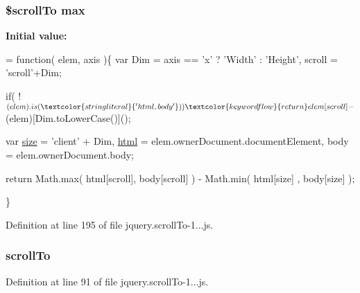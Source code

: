 \subsubsection[{\texorpdfstring{max}{max}}]{\setlength{\rightskip}{0pt plus 5cm}\${\bf scroll\+To} max}\hypertarget{jquery_8scrollTo-1_84_82_8js_a954f280ed2a81443e342686e9a429716}{}\label{jquery_8scrollTo-1_84_82_8js_a954f280ed2a81443e342686e9a429716}
{\bfseries Initial value\+:}
\begin{DoxyCode}
= \textcolor{keyword}{function}( elem, axis )\{
        var Dim = axis == \textcolor{charliteral}{'x'} ? \textcolor{stringliteral}{'Width'} : \textcolor{stringliteral}{'Height'},
            scroll = \textcolor{stringliteral}{'scroll'}+Dim;
        
        \textcolor{keywordflow}{if}( !$(elem).is(\textcolor{stringliteral}{'html,body'}) )
            \textcolor{keywordflow}{return} elem[scroll] - $(elem)[Dim.toLowerCase()]();
        
        var \hyperlink{jquery-1_8x_8js_afa6806c6ee5e63d5177f1dcc082ba6bc}{size} = \textcolor{stringliteral}{'client'} + Dim,
            \hyperlink{JSSpec_8js_a28141bc89afb42a8f39e596105992271}{html} = elem.ownerDocument.documentElement,
            body = elem.ownerDocument.body;

        \textcolor{keywordflow}{return} Math.max( html[scroll], body[scroll] ) 
             - Math.min( html[size]  , body[size]   );
            
    \}
\end{DoxyCode}


Definition at line 195 of file jquery.\+scroll\+To-\/1...\+js.

\subsubsection[{\texorpdfstring{scroll\+To}{scrollTo}}]{ scroll\+To}\hypertarget{jquery_8scrollTo-1_84_82_8js_a9192e39878bc163c30c3932049fffce7}{}\label{jquery_8scrollTo-1_84_82_8js_a9192e39878bc163c30c3932049fffce7}


Definition at line 91 of file jquery.\+scroll\+To-\/1...\+js.


